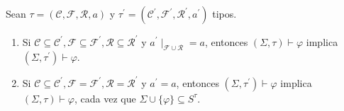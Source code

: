   \begin{lemma} \label{lemma_78}
    \PN Sean $\tau = (\mathcal{C}, \mathcal{F}, \mathcal{R}, a)$ y $\tau^{\prime} = (\mathcal{C}^{\prime},
    \mathcal{F}^{\prime}, \mathcal{R}^{\prime}, a^{\prime})$ tipos.
    \begin{enumerate}
      \item Si $\mathcal{C} \subseteq \mathcal{C}^{\prime}, \mathcal{F} \subseteq \mathcal{F}^{\prime}, \mathcal{R}
      \subseteq \mathcal{R}^{\prime}$ y $a^{\prime}\mid_{\mathcal{F} \cup \mathcal{R}} = a$, entonces $(\Sigma, \tau)
      \vdash \varphi$ implica $(\Sigma, \tau^{\prime}) \vdash \varphi$.
      \item Si $\mathcal{C} \subseteq \mathcal{C}^{\prime}, \mathcal{F} = \mathcal{F}^{\prime}, \mathcal{R} =
      \mathcal{R}^{\prime}$ y $a^{\prime} = a$, entonces $(\Sigma, \tau^{\prime}) \vdash \varphi$ implica $(\Sigma,
      \tau) \vdash \varphi$, cada vez que $\Sigma \cup \{\varphi\} \subseteq S^{\tau}$.
    \end{enumerate}
  \end{lemma}
